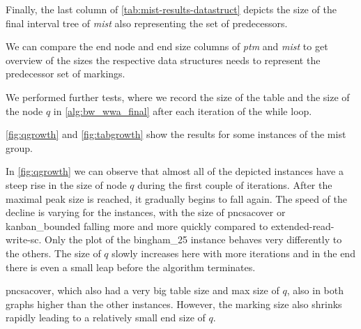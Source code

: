 Finally, the last column of \autoref{tab:mist-results-datastruct} depicts the size of the final interval tree of \textit{mist} also representing the set of predecessors.

We can compare the end node and end size columns of \textit{ptm} and \textit{mist} to get overview of the sizes the respective data structures needs to represent the predecessor set of markings. 

\bigbreak 

We performed further tests, where we record the size of the table and the size of the node $q$ in \autoref{alg:bw_wwa_final} after each iteration of the while loop. 


\autoref{fig:qgrowth} and \autoref{fig:tabgrowth} show the results for some instances of the mist group.

In \autoref{fig:qgrowth} we can observe that almost all of the depicted instances have a steep rise in the size of node $q$ during the first couple of iterations. After the maximal peak size is reached, it gradually begins to fall again. The speed of the decline is varying for the instances, with the size of pncsacover or kanban\_bounded falling more and more quickly compared to extended-read-write-sc.
Only the plot of the bingham\_25 instance behaves very differently to the others. The size of $q$ slowly increases here with more iterations and in the end there is even a small leap before the algorithm terminates. 

pncsacover, which also had a very big table size and max size of $q$, also in both graphs higher than the other instances. However, the marking size also shrinks rapidly leading to a relatively small end size of $q$.





